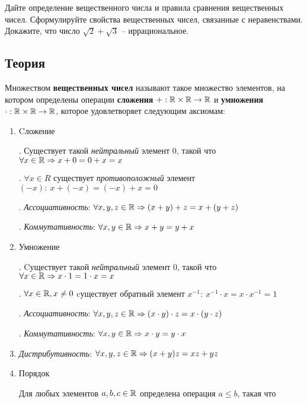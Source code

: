 Дайте определение вещественного числа и правила сравнения вещественных чисел. Сформулируйте свойства вещественных чисел, связанные с неравенствами. Докажите, что число $\sqrt{2} + \sqrt{3}$ -- иррациональное.


\subsection*{Теория}

\begin{definition}
	Множеством \textbf{вещественных чисел} называют такое множество элементов, на котором определены операции \textbf{сложения} $+: \mathbb{R} \times \mathbb{R} \rightarrow \mathbb{R}$ и \textbf{умножения} $\cdot: \mathbb{R} \times \mathbb{R} \rightarrow \mathbb{R}$, которое удовлетворяет следующим аксиомам:
\end{definition}
\begin{enumerate}
	\item Cложение
	
	. Существует такой \textit{нейтральный} элемент 0, такой что $\forall x \in \mathbb{R} \Rightarrow x + 0 = 0 + x = x$
	
	. $\forall x \in R $ существует \textit{противоположный} элемент $ (-x): \  x + (-x) = (-x) + x = 0$
	
	. \textit{Ассоциативность}: $\forall x, y, z \in \mathbb{R} \Rightarrow (x + y) + z = x + (y + z)$
	
	. \textit{Коммутативность}: $\forall x, y \in \mathbb{R} \Rightarrow x + y = y + x$
	
	
	\item Умножение
	
	. Cуществует такой \textit{нейтральный} элемент 0, такой что $\forall x \in \mathbb{R} \Rightarrow x \cdot 1 = 1 \cdot x = x$
	
	. $\forall x \in \mathbb{R}, x \neq 0$ cуществует обратный элемент $x^{-1}: \ x^{-1} \cdot x = x \cdot x^{-1} = 1$
	
	. \textit{Ассоциативность}: $\forall x, y, z \in \mathbb{R} \Rightarrow (x \cdot y) \cdot z = x \cdot (y \cdot z)$
	
	. \textit{Коммутативность}: $\forall x, y \in \mathbb{R} \Rightarrow x \cdot y = y \cdot x$
	
	\item \textit{Дистрибутивность}: $\forall x, y, z \in \mathbb{R} \Rightarrow (x + y)z = xz + yz$
	
	\item Порядок
			
	Для любых элементов $a, b, c \in \mathbb{R}$ определена операция $a \leqslant b$, такая что
	

\end{enumerate}
